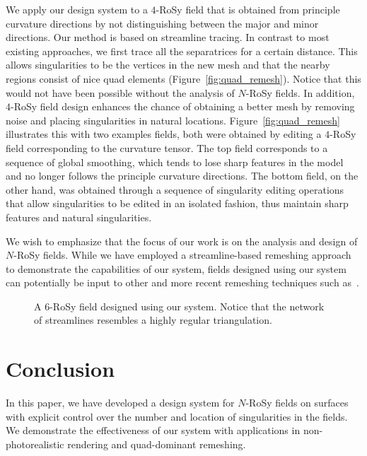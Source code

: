 \documentclass{acmsiggraph}               %
\begin{document}
We apply our design system to a $4$-RoSy field that is obtained from
principle curvature directions by not distinguishing between the
major and minor directions. Our method is based on streamline
tracing. In contrast to most existing approaches, we first trace all
the separatrices for a certain distance. This allows singularities
to be the vertices in the new mesh and that the nearby regions
consist of nice quad elements (Figure~\ref{fig:quad_remesh}). Notice
that this would not have been possible without the analysis of
$N$-RoSy fields. In addition, $4$-RoSy field design enhances the
chance of obtaining a better mesh by removing noise and placing
singularities in natural locations. Figure~\ref{fig:quad_remesh}
illustrates this with two examples fields, both were obtained by
editing a $4$-RoSy field corresponding to the curvature tensor. The
top field corresponds to a sequence of global smoothing, which tends
to lose sharp features in the model and no longer follows the
principle curvature directions. The bottom field, on the other hand,
was obtained through a sequence of singularity editing operations
that allow singularities to be edited in an isolated fashion, thus
maintain sharp features and natural singularities.

We wish to emphasize that the focus of our work is on the analysis
and design of $N$-RoSy fields. While we have employed a
streamline-based remeshing approach~\cite{Alliez:03} to demonstrate
the capabilities of our system, fields designed using our system can
potentially be input to other and more recent remeshing techniques
such as~\cite{Ray:06}.

\begin{figure}[t]
\centerline{}
\caption[]{ A $6$-RoSy field designed using our system. Notice that
the network of streamlines resembles a highly regular triangulation.
}\label{fig:triangle}
\end{figure}

\section{Conclusion}
\label{sec:conclusion}

In this paper, we have developed a design system for $N$-RoSy fields
on surfaces with explicit control over the number and location of
singularities in the fields. We demonstrate the effectiveness of our
system with applications in non-photorealistic rendering and
quad-dominant remeshing.
\end{document}

